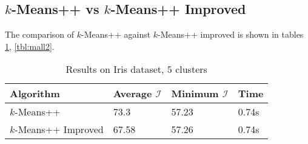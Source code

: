 \documentclass[twoside, 11pt]{article}
\newcommand{\I}{\mathcal{I}}
\begin{document}
	\subsection{$k$-Means++ vs $k$-Means++ Improved}
	The comparison of $k$-Means++ against $k$-Means++ improved is shown in tables \ref{tbl:iris2}, \ref{tbl:mall2}.
		\begin{table}
			\begin{center}
				\begin{tabular}{|l|l|l|l|}
					\hline
					Algorithm & Average $\I$& Minimum $\I$& Time\\\hline
					$k$-Means++ & 73.3& 57.23& 0.74s\\\hline
					$k$-Means++ Improved& 67.58& 57.26& 0.74s\\\hline
				\end{tabular}
				\caption{Results on Iris dataset, $5$ clusters}
				\label{tbl:iris2}
			\end{center}
		\end{table}
	
\end{document}
